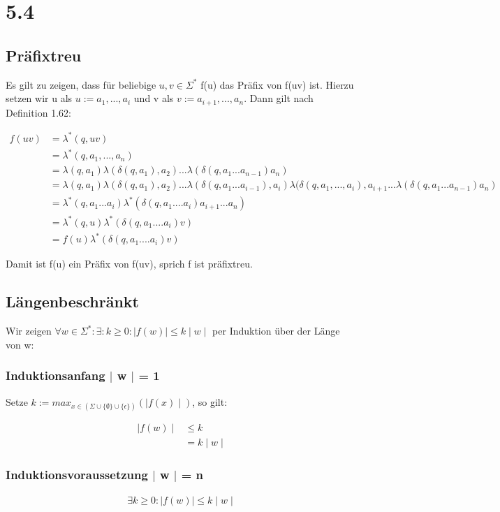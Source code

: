 \documentclass[12pt, a4paper]{article}
\begin{document}
\section*{5.4}

\subsection*{Präfixtreu}
Es gilt zu zeigen, dass für beliebige $u,v \in \Sigma^*$ f(u) das Präfix von f(uv) ist. Hierzu setzen wir u als $u := a_1,...,a_i$ und v als $v := a_{i+1},...,a_n$. Dann gilt nach Definition 1.62:

\begin{align*}
f(uv) &= \lambda^*(q,uv) \\
&= \lambda^*(q, a_1,...,a_n) \\
&= \lambda(q,a_1) \lambda(\delta(q, a_1), a_2) ... \lambda(\delta(q,a_1...a_{n-1})a_n) \\
&= \lambda(q,a_1) \lambda(\delta(q, a_1), a_2) ... \lambda(\delta(q, a_1 ... a_{i-1}), a_i) \lambda(\delta(q, a_1,..., a_i), a_{i+1} ...  \lambda(\delta(q,a_1...a_{n-1})a_n) \\
&= \lambda^*(q,a_1 ... a_i) \lambda^*(\delta(q, a_1 .... a_i) a_{i+1} ... a_n) \\
&= \lambda^*(q,u) \lambda^*(\delta(q, a_1 .... a_i) v)\\
&= f(u) \lambda^*(\delta(q, a_1 .... a_i) v)
\end{align*}

Damit ist f(u) ein Präfix von f(uv), sprich f ist präfixtreu.

\subsection*{Längenbeschränkt}
Wir zeigen $\forall w \in \Sigma^*: \exists: k \ge 0: \mid f(w) \mid \le k \mid w \mid $ per Induktion über der Länge von w:

\subsubsection*{Induktionsanfang $\mid$ w $\mid$ = 1}
Setze $k := max_{x \in (\Sigma \cup \{ \emptyset \} \cup \{ \epsilon \})}( \mid f(x) \mid)$, so gilt:

\begin{align*}
\mid f(w) \mid &\le k \\
&= k \mid w \mid
\end{align*}

\subsubsection*{Induktionsvoraussetzung $\mid$ w $\mid$ = n}
\begin{align*}
\exists k \ge 0: \mid f(w) \mid \le k \mid w \mid
\end{align*}
\end{document}
